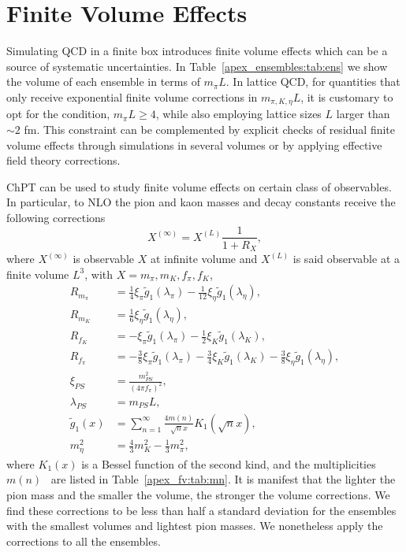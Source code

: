
\chapter{Finite Volume Effects}
\label{apex_fv}

Simulating QCD in a finite box introduces finite volume effects which can be a source of systematic uncertainties. In Table~\ref{apex_ensembles:tab:ens} we show the volume of each ensemble in terms of $m_{\pi}L$. In lattice QCD, for quantities that only receive exponential finite volume corrections in $m_{\pi,K,\eta}L$, it is customary to opt for the condition, $m_{\pi}L\geq4$, while also employing lattice sizes $L$ larger than $\sim2$ fm. This constraint can be complemented by explicit checks of residual finite volume effects through simulations in several volumes or by applying effective field theory corrections.

ChPT can be used to study finite volume effects on certain class of observables. In particular, to NLO the pion and kaon masses and decay constants receive the following corrections~\citep{Gasser:1986vb,Colangelo:2003hf,Colangelo:2005gd}
\begin{equation}
X^{(\infty)}=X^{(L)}\frac{1}{1+R_X},
\end{equation}
where $X^{(\infty)}$ is observable $X$ at infinite volume and $X^{(L)}$ is said observable at a finite volume $L^3$, with $X=m_{\pi},m_K,f_{\pi},f_K$,
\begin{align}
R_{m_{\pi}}&=\frac{1}{4}\xi_{\pi}\tilde{g}_1(\lambda_{\pi})-\frac{1}{12}\xi_{\eta}\tilde{g}_1(\lambda_{\eta}), \\
R_{m_K}&=\frac{1}{6}\xi_{\eta}\tilde{g}_1(\lambda_{\eta}), \\
R_{f_K}&=-\xi_{\pi}\tilde{g}_1(\lambda_{\pi})-\frac{1}{2}\xi_{K}\tilde{g}_1(\lambda_{K}), \\
R_{f_{\pi}}&=-\frac{3}{8}\xi_{\pi}\tilde{g}_1(\lambda_{\pi})-\frac{3}{4}\xi_{K}\tilde{g}_1(\lambda_{K})-\frac{3}{8}\xi_{\eta}\tilde{g}_1(\lambda_{\eta}), \\
\xi_{PS}&=\frac{m_{PS}^2}{(4\pi f_{\pi})^2}, \\
\lambda_{PS}&=m_{PS}L, \\
\tilde{g}_1(x)&=\sum_{n=1}^{\infty}\frac{4m(n)}{\sqrt{n}x}K_1(\sqrt{n}x), \\
m_{\eta}^2&=\frac{4}{3}m_K^2-\frac{1}{3}m_{\pi}^2,
\end{align}
where $K_1(x)$ is a Bessel function of the second kind, and the multiplicities $m(n)$~\citep{Colangelo:2003hf} are listed in Table~\ref{apex_fv:tab:mn}. It is manifest that the lighter the pion mass and the smaller the volume, the stronger the volume corrections. We find these corrections to be less than half a standard deviation for the ensembles with the smallest volumes and lightest pion masses. We nonetheless apply the corrections to all the ensembles.


